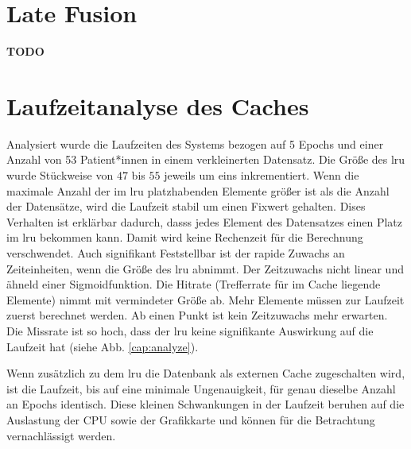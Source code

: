 \clearpage
\section{Late Fusion}\label{latefusion}
\textbf{TODO}






















\clearpage
\section{Laufzeitanalyse des Caches}\label{analyze}
Analysiert wurde die Laufzeiten des Systems bezogen auf 5 Epochs und einer Anzahl von 53 Patient*innen in einem verkleinerten Datensatz. Die Größe des \ac{lru} wurde Stückweise von $47$ bis $55$ jeweils um eins inkrementiert. Wenn die maximale Anzahl der im \ac{lru} platzhabenden Elemente größer ist als die Anzahl der Datensätze, wird die Laufzeit stabil um einen Fixwert gehalten. Dises Verhalten ist erklärbar dadurch, dasss jedes Element des Datensatzes einen Platz im \ac{lru} bekommen kann. Damit wird keine Rechenzeit für die Berechnung verschwendet. Auch signifikant Feststellbar ist der rapide Zuwachs an Zeiteinheiten, wenn die Größe des \ac{lru} abnimmt. Der Zeitzuwachs nicht linear und ähneld einer Sigmoidfunktion. Die Hitrate (Trefferrate für im Cache liegende Elemente) nimmt mit vermindeter Größe ab. Mehr Elemente müssen zur Laufzeit zuerst berechnet werden. Ab einen Punkt ist kein Zeitzuwachs mehr erwarten. Die Missrate ist so hoch, dass der \ac{lru} keine signifikante Auswirkung auf die Laufzeit hat (siehe Abb. \ref{cap:analyze}).

Wenn zusätzlich zu dem \ac{lru} die Datenbank als externen Cache zugeschalten wird, ist die Laufzeit, bis auf eine minimale Ungenauigkeit, für genau dieselbe Anzahl an Epochs identisch. Diese kleinen Schwankungen in der Laufzeit beruhen auf die Auslastung der CPU sowie der Grafikkarte und können für die Betrachtung vernachlässigt werden.


